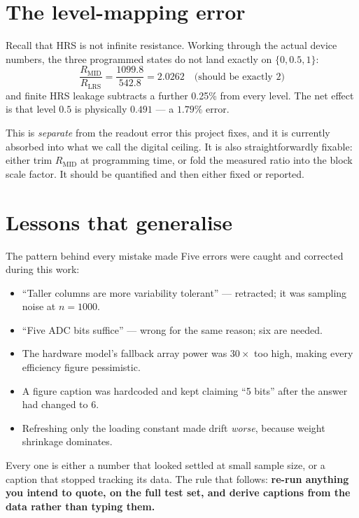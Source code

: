 \documentclass[11pt,a4paper]{report}
\begin{document}
\section{The level-mapping error}
\label{sec:levelerr}

Recall that HRS is not infinite resistance. Working through the actual device
numbers, the three programmed states do not land exactly on $\{0, 0.5, 1\}$:
\[
\frac{R_{\mathrm{MID}}}{R_{\mathrm{LRS}}} = \frac{1099.8}{542.8} = 2.0262
\quad\text{(should be exactly 2)}
\]
and finite HRS leakage subtracts a further 0.25\% from every level. The net
effect is that level $0.5$ is physically $0.491$ --- a $1.79\%$ error.

This is \emph{separate} from the readout error this project fixes, and it is
currently absorbed into what we call the digital ceiling. It is also
straightforwardly fixable: either trim $R_{\mathrm{MID}}$ at programming time,
or fold the measured ratio into the block scale factor. It should be
quantified and then either fixed or reported.

\section{Lessons that generalise}

\begin{warnbox}{The pattern behind every mistake made}
Five errors were caught and corrected during this work:
\begin{itemize}[leftmargin=1.3em]
  \item ``Taller columns are more variability tolerant'' --- retracted; it was
        sampling noise at $n=1000$.
  \item ``Five ADC bits suffice'' --- wrong for the same reason; six are
        needed.
  \item The hardware model's fallback array power was $30\times$ too high,
        making every efficiency figure pessimistic.
  \item A figure caption was hardcoded and kept claiming ``5 bits'' after the
        answer had changed to 6.
  \item Refreshing only the loading constant made drift \emph{worse}, because
        weight shrinkage dominates.
\end{itemize}

Every one is either a number that looked settled at small sample size, or a
caption that stopped tracking its data. The rule that follows: \textbf{re-run
anything you intend to quote, on the full test set, and derive captions from
the data rather than typing them.}
\end{warnbox}
\end{document}
